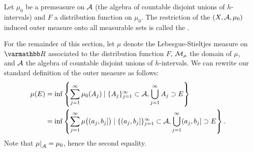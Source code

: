     \begin{definition}
        Let $\mu_0$ be a premeasure on $\mathcal{A}$ (the algebra of countable disjoint unions of $h$-intervals) and $F$ a distribution function on $\mu_0$. The restriction of the $(X,\mathcal{A},\mu_0)$ induced outer measure onto all measurable sets is called the .
    \end{definition}\phantom{a}\nl
    
    \noindent For the remainder of this section, let $\mu$ denote the Lebesgue-Stieltjes measure on $\bfR$ associated to the distribution function $F$, $\mathcal{M}_\mu$ the domain of $\mu$, and $\mathcal{A}$ the algebra of countable disjoint unions of $h$-intervals. We can rewrite our standard definition of the outer measure as follows:
        \begin{equation*}
        \begin{split}
            \mu(E) 
            & = \inf\left\{ \sum_{j = 1}^\infty \mu_0(A_j) \mid \{A_j\}_{j = 1}^\infty \subset \mathcal{A}, \bigcup_{j = 1}^\infty A_j \supset E\right\} \\
            & = \inf \left\{ \sum_{j = 1}^\infty \mu \bigl((a_j,b_j]\bigr) \mid  \{(a_j,b_j]\}_{j = 1}^\infty \subset \mathcal{A}, \bigcup_{j = 1}^\infty (a_j,b_j] \supset E\right\}.
        \end{split}
        \end{equation*}
    Note that $\restr{\mu}{\cA} = \mu_0$, hence the second equality.

